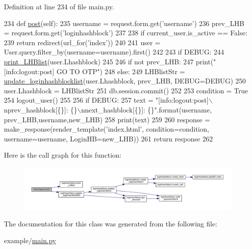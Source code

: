 Definition at line 234 of file main.\+py.


\begin{DoxyCode}
234     \textcolor{keyword}{def }\hyperlink{classmain_1_1logout_a726ef779e6bf4da8974eae3209276922}{post}(self):
235         username = request.form.get(\textcolor{stringliteral}{'username'})
236         prev\_LHB = request.form.get(\textcolor{stringliteral}{'loginhashblock'})
237 
238         \textcolor{keywordflow}{if} current\_user.is\_active == \textcolor{keyword}{False}:
239             \textcolor{keywordflow}{return} redirect(url\_for(\textcolor{stringliteral}{'index'}))
240 
241         user = User.query.filter\_by(username=username).first()
242 
243         \textcolor{keywordflow}{if} DEBUG:
244             \hyperlink{namespaceloginhashblock_af47615d0e87d554eae9e6d49131fe49c}{print\_LHBlist}(user.Lhashblock)
245 
246         \textcolor{keywordflow}{if} \textcolor{keywordflow}{not} prev\_LHB:
247             print(\textcolor{stringliteral}{"[info:logout:post] GO TO OTP"})
248         \textcolor{keywordflow}{else}:
249             LHBlistStr = \hyperlink{namespaceloginhashblock_a7baa4021b9f57044f8227c2e0320ee2b}{update\_loginhashblocklist}(user.Lhashblock, prev\_LHB, 
      DEBUG=DEBUG)
250             user.Lhashblock = LHBlistStr
251             db.session.commit()
252 
253         condition = \textcolor{keyword}{True}
254         logout\_user()
255 
256         \textcolor{keywordflow}{if} DEBUG:
257             text = \textcolor{stringliteral}{"[info:logout:post]\(\backslash\)nprev\_hashblock[\{\}]: \{\}\(\backslash\)nnext\_hashblock[\{\}]: \{\}"}.format(username,
      prev\_LHB,username,new\_LHB)
258             print(text)
259 
260         response = make\_response(render\_template(\textcolor{stringliteral}{'index.html'}, condition=condition, username=username, 
      LoginHB=new\_LHB))
261         \textcolor{keywordflow}{return} response
262 
\end{DoxyCode}


Here is the call graph for this function\+:\nopagebreak
\begin{figure}[H]
\begin{center}
\leavevmode
\includegraphics[width=350pt]{classmain_1_1logout_a726ef779e6bf4da8974eae3209276922_cgraph}
\end{center}
\end{figure}




The documentation for this class was generated from the following file\+:\begin{DoxyCompactItemize}
\item 
example/\hyperlink{main_8py}{main.\+py}\end{DoxyCompactItemize}
